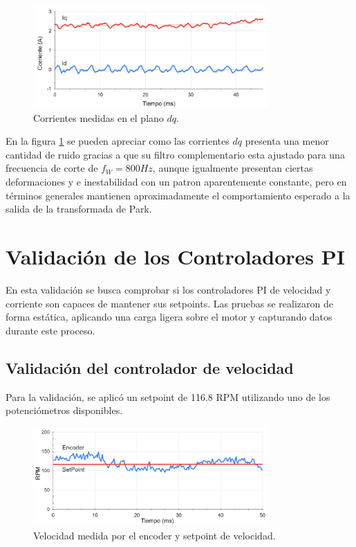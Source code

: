 \documentclass[11pt]{report}
\begin{document}
\begin{figure}[ht]
	\centering
	\includegraphics[width=0.8\textwidth]{imagenes/Corrientes_dq.png}
	\caption{Corrientes medidas en el plano $dq$.}
	\label{corrientes_dq}
\end{figure}
\FloatBarrier

En la figura \ref{corrientes_dq} se pueden apreciar como las corrientes $dq$ presenta una menor cantidad de ruido gracias a que su filtro complementario esta ajustado para una frecuencia de corte de $f_W=800Hz$, aunque igualmente presentan ciertas deformaciones y e inestabilidad con un patron aparentemente constante, pero en términos generales mantienen aproximadamente el comportamiento esperado a la salida de la transformada de Park.

\newpage
\section{Validación de los Controladores PI}
En esta validación se busca comprobar si los controladores PI de velocidad y corriente son capaces de mantener sus setpoints. Las pruebas se realizaron de forma estática, aplicando una carga ligera sobre el motor y capturando datos durante este proceso.

\subsection{Validación del controlador de velocidad}
Para la validación, se aplicó un setpoint de 116.8 RPM utilizando uno de los potenciómetros disponibles.

\begin{figure}[ht]
	\centering
	\includegraphics[width=0.8\textwidth]{imagenes/CV.png}
	\caption{Velocidad medida por el encoder y setpoint de velocidad.}
	\label{velocidad_encoder}
\end{figure}
\FloatBarrier
\end{document}
